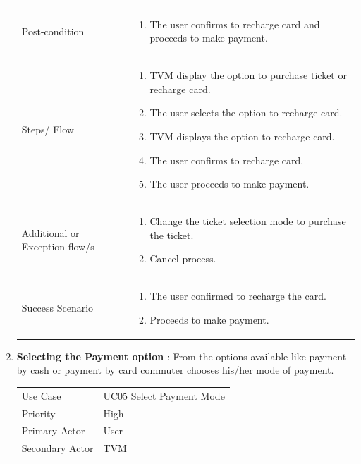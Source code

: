 \documentclass[15pt]{article}
\begin{document}
\begin{enumerate}[leftmargin=2em, itemsep=0pt, parsep=0pt, , font=\Large\bfseries]
\begin{tabularx}{1\textwidth} { 
  | >{\raggedright\arraybackslash}X 
  | >{\raggedright\arraybackslash}X 
  | }
   Post-condition  & \begin{enumerate}
  \item The user confirms to recharge card and proceeds to make payment.
  \end{enumerate}
  \\
  
  Steps/ Flow  & \begin{enumerate}
  \item  TVM display the option to purchase ticket or recharge card.
  \item The user selects the option to recharge card.
  \item TVM displays the option to recharge card.
  \item  The user confirms to recharge card.
  \item The user proceeds to make payment.
  \end{enumerate}
  \\
  
   Additional or Exception flow/s  & \begin{enumerate}
  \item  Change the ticket selection mode to purchase the ticket.
  \item  Cancel process.
  \end{enumerate}
  \\
    
   Success Scenario  & \begin{enumerate}
  \item The user confirmed to recharge the card.
  \item Proceeds to make payment.
  \end{enumerate}
  \\

\hline
\end{tabularx}



\newpage
\item {\Large\bfseries{Selecting the Payment option}} : From the options available like payment by cash or payment by card commuter chooses his/her mode of payment.
\newline
\newline
\begin{tabularx}{1\textwidth} { 
  | >{\raggedright\arraybackslash}X 
  | >{\raggedright\arraybackslash}X 
  | }
 \hline
 Use Case & UC05 Select Payment Mode \\
 Priority & High \\
 Primary Actor  & User \\
 Secondary Actor  & TVM \\


\end{tabularx}
\end{enumerate}
\end{document}
